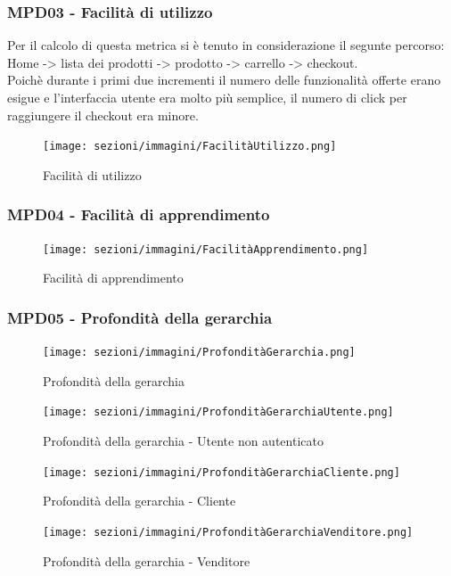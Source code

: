 \subsubsection{MPD03 - Facilità di utilizzo}
Per il calcolo di questa metrica si è tenuto in considerazione il segunte percorso:\\
Home -> lista dei prodotti -> prodotto -> carrello -> checkout.\\
Poichè durante i primi due incrementi il numero delle funzionalità offerte erano esigue e l'interfaccia utente era molto più semplice,
il numero di click per raggiungere il checkout era minore.
\begin{figure}[!ht]
    \caption{Facilità di utilizzo}
    \vspace{10px}
    \texttt{[image: sezioni/immagini/FacilitàUtilizzo.png]}
    \centering
\end{figure}
\subsubsection{MPD04 - Facilità di apprendimento}
\begin{figure}[!ht]
    \caption{Facilità di apprendimento}
    \vspace{10px}
    \texttt{[image: sezioni/immagini/FacilitàApprendimento.png]}
    \centering
\end{figure}
\pagebreak
\subsubsection{MPD05 - Profondità della gerarchia}
\begin{figure}[!ht]
    \caption{Profondità della gerarchia}
    \vspace{10px}
    \texttt{[image: sezioni/immagini/ProfonditàGerarchia.png]}
    \centering
\end{figure}
\begin{figure}[!ht]
    \caption{Profondità della gerarchia - Utente non autenticato}
    \vspace{10px}
    \texttt{[image: sezioni/immagini/ProfonditàGerarchiaUtente.png]}
    \centering
\end{figure}
\pagebreak
\begin{figure}[!ht]
    \caption{Profondità della gerarchia - Cliente}
    \vspace{10px}
    \texttt{[image: sezioni/immagini/ProfonditàGerarchiaCliente.png]}
    \centering
\end{figure}
\begin{figure}[!ht]
    \caption{Profondità della gerarchia - Venditore}
    \vspace{10px}
    \texttt{[image: sezioni/immagini/ProfonditàGerarchiaVenditore.png]}
    \centering
\end{figure}
\pagebreak
